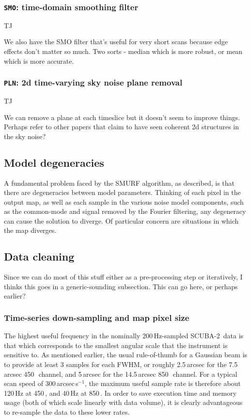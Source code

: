 \documentclass[useAMS,usenatbib,nofootinbib]{mn2e}
\newcommand{\scuba}{SCUBA-2}
\newcommand{\model}[1]{\texttt{#1}}
\begin{document}
\subsubsection{\model{SMO}: time-domain smoothing filter}
\label{sec:smo}

TJ

We also have the SMO filter that's useful for very short scans
because edge effects don't matter so much. Two sorts - median which is
more robust, or mean which is more accurate.

\subsubsection{\model{PLN}: 2d time-varying sky noise plane removal}
\label{sec:pln}

TJ

We can remove a plane at each timeslice but it doesn't seem to improve
things. Perhaps refer to other papers that claim to have seen coherent
2d structures in the sky noise?

\subsection{Model degeneracies}

A fundamental problem faced by the SMURF algorithm, as described, is
that there are degeneracies between model parameters. Thinking of each
pixel in the output map, as well as each sample in the various noise
model components, such as the common-mode and signal removed by the
Fourier filtering, any degeneracy can cause the solution to
diverge. Of particular concern are situations in which the map
diverges.

\subsection{Data cleaning}

Since we can do most of this stuff either as a pre-processing step or
iteratively, I thinks this goes in a generic-sounding subsection. This
can go here, or perhaps earlier?

\subsubsection{Time-series down-sampling and map pixel size}
\label{sec:downsamp}

The highest useful frequency in the nominally 200\,Hz-sampled
\scuba\ data is that which corresponds to the smallest angular scale
that the instrument is sensitive to. As mentioned earlier, the usual
rule-of-thumb for a Gaussian beam is to provide at least 3 samples for
each FWHM, or roughly 2.5\,arcsec for the 7.5\,arcsec
450\,\micron\ channel, and 5\,arcsec for the 14.5\,arcsec
850\,\micron\ channel. For a typical scan speed of
300\,arcsec\,s$^{-1}$, the maximum useful sample rate is therefore
about 120\,Hz at 450\,\micron, and 40\,Hz at 850\,\micron. In order to
save execution time and memory usage (both of which scale linearly
with data volume), it is clearly advantageous to re-sample the data to
these lower rates.
\end{document}
